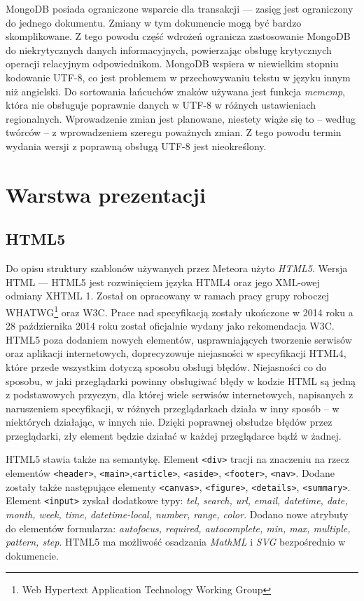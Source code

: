 MongoDB posiada ograniczone wsparcie dla transakcji --- zasięg jest ograniczony do jednego dokumentu. Zmiany w tym dokumencie mogą być bardzo skomplikowane. Z tego powodu część wdrożeń ogranicza zastosowanie MongoDB do niekrytycznych danych informacyjnych, powierzając obsługę krytycznych operacji relacyjnym odpowiednikom. 
MongoDB wspiera w niewielkim stopniu kodowanie UTF-8, co jest problemem w przechowywaniu tekstu w języku innym niż angielski. Do sortowania łańcuchów znaków używana jest funkcja \emph{memcmp}, która nie obsługuje poprawnie danych w UTF-8 w różnych ustawieniach regionalnych. Wprowadzenie zmian jest planowane, niestety wiąże się to -- według twórców -- z wprowadzeniem szeregu poważnych zmian. Z tego powodu termin wydania wersji z poprawną obsługą UTF-8 jest nieokreślony\cite{mongoWiki}.

\section{Warstwa prezentacji}
\subsection{HTML5}

Do opisu struktury szablonów używanych przez Meteora użyto \emph{HTML5}. Wersja HTML --- HTML5 jest rozwinięciem języka HTML4 oraz jego XML-owej odmiany XHTML 1. Został on opracowany w ramach pracy grupy roboczej WHATWG\footnote{Web Hypertext Application Technology Working Group} oraz W3C. Prace nad specyfikacją zostały ukończone w 2014 roku a 28 października 2014 roku został oficjalnie wydany jako rekomendacja W3C. HTML5 poza dodaniem nowych elementów, usprawniających tworzenie serwisów oraz aplikacji internetowych, doprecyzowuje niejasności w specyfikacji HTML4, które przede wszystkim dotyczą sposobu obsługi błędów. Niejasności co do sposobu, w jaki przeglądarki powinny obsługiwać błędy w kodzie HTML są jedną z podstawowych przyczyn, dla której wiele serwisów internetowych, napisanych z naruszeniem specyfikacji, w różnych przeglądarkach działa w inny sposób -- w niektórych działając, w innych nie. Dzięki poprawnej obsłudze błędów przez przeglądarki, zły element będzie działać w każdej przeglądarce bądź w żadnej. 

HTML5 stawia także na semantykę. Element \verb|<div>| tracji na znaczeniu na rzecz elementów \verb|<header>|, \verb|<main>|,\verb|<article>|, \verb|<aside>|, \verb|<footer>|, \verb|<nav>|. Dodane zostały także następujące elementy \verb|<canvas>|, \verb|<figure>|, \verb|<details>|, \verb|<summary>|. Element \verb|<input>| zyskał dodatkowe typy: \textit{tel, search, url, email, datetime, date, month, week, time, datetime-local, number, range, color}. Dodano nowe atrybuty do elementów formularza: \textit{autofocus, required, autocomplete, min, max, multiple, pattern, step}. HTML5 ma możliwość osadzania \emph{MathML} i \emph{SVG} bezpośrednio w dokumencie\cite{htmlWiki}.

